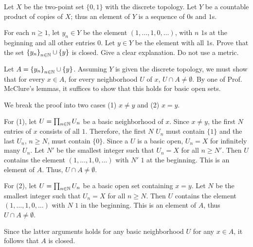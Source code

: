 \begin{problem}
  Let \(X\) be the two-point set \(\{0,1\}\) with the discrete
  topology. Let \(Y\) be a countable product of copies of \(X\); thus an
  element of \(Y\) is a sequence of \(0\)s and \(1\)s.

  For each \(n\geq 1\), let \(y_n\in Y\) be the element
  \((1,\dotsc,1,0,\dotsc)\), with \(n\) \(1\)s at the beginning and all
  other entries \(0\). Let \(y\in Y\) be the element with all \(1\)s. Prove
  that the set \({\{y_n\}}_{n\in\mathbb{N}}\cup\{y\}\) is closed. Give a clear
  explanation. Do not use a metric.
\end{problem}
\begin{solution}
  Let \(A={\{y_n\}}_{n\in\mathbb{N}}\cup\{y\}\). Assuming \(Y\) is given the
  discrete topology, we must show that for every \(x\in A\), for every
  neighborhood \(U\) of \(x\), \(U\cap A\neq\emptyset\). By one of Prof.\@
  McClure's lemmas, it suffices to show that this holds for basic open
  sets.

  We break the proof into two cases (1) \(x\neq y\) and (2) \(x=y\).

  For (1), let \(U=\prod_{n\in\mathbb{N}} U_n\) be a basic neighborhood of
  \(x\). Since \(x\neq y\), the first \(N\) entries of \(x\) consists of
  all \(1\). Therefore, the first \(N\) \(U_n\) must contain \(\{1\}\) and
  the last \(U_n\), \(n\geq N\), must contain \(\{0\}\). Since a \(U\) is a
  basic open, \(U_n=X\) for infinitely many \(U_n\). Let $N'$ be the
  smallest integer such that \(U_n=X\) for all \(n\geq N'\). Then \(U\)
  contains the element \((1,\dotsc,1,0,\dotsc)\) with \(N'\) \(1\) at the
  beginning. This is an element of \(A\). Thus, \(U\cap A\neq\emptyset\).

  For (2), let \(U=\prod_{n\in\mathbb{N}} U_n\) be a basic open set containing
  \(x=y\). Let \(N\) be the smallest integer such that \(U_n=X\) for all
  \(n\geq N\). Then \(U\) contains the element \((1,\dotsc,1,0,\dotsc)\)
  with \(N\) \(1\) in the beginning. This is an element of \(A\), thus
  \(U\cap A\neq\emptyset\).

  Since the latter arguments holds for any basic neighborhood \(U\) for any
  \(x\in A\), it follows that \(A\) is closed.
\end{solution}

